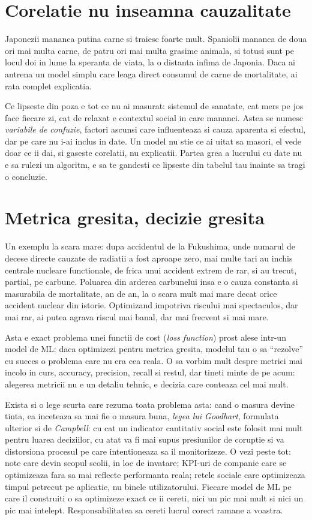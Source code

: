 \section*{Corelatie nu inseamna cauzalitate}

Japonezii mananca putina carne si traiesc foarte mult. Spaniolii mananca
de doua ori mai multa carne, de patru ori mai multa grasime animala, si
totusi sunt pe locul doi in lume la speranta de viata, la o distanta
infima de Japonia. Daca ai antrena un model simplu care leaga direct
consumul de carne de mortalitate, ai rata complet explicatia.

Ce lipseste din poza e tot ce nu ai masurat: sistemul de sanatate, cat
mers pe jos face fiecare zi, cat de relaxat e contextul social in care
mananci. Astea se numesc \textit{variabile de confuzie}, factori ascunsi
care influenteaza si cauza aparenta si efectul, dar pe care nu i-ai
inclus in date. Un model nu stie ce ai uitat sa masori, el vede doar ce
ii dai, si gaseste corelatii, nu explicatii. Partea grea a lucrului cu
date nu e sa rulezi un algoritm, e sa te gandesti ce lipseste din tabelul
tau inainte sa tragi o concluzie.

\section*{Metrica gresita, decizie gresita}

Un exemplu la scara mare: dupa accidentul de la Fukushima, unde numarul
de decese directe cauzate de radiatii a fost aproape zero, mai multe tari
au inchis centrale nucleare functionale, de frica unui accident extrem de
rar, si au trecut, partial, pe carbune. Poluarea din arderea carbunelui
insa e o cauza constanta si masurabila de mortalitate, an de an, la o
scara mult mai mare decat orice accident nuclear din istorie. Optimizand
impotriva riscului mai spectaculos, dar mai rar, ai putea agrava riscul
mai banal, dar mai frecvent si mai mare.

Asta e exact problema unei functii de cost (\textit{loss function}) prost
alese intr-un model de ML: daca optimizezi pentru metrica gresita, modelul
tau o sa ``rezolve'' cu succes o problema care nu era cea reala. O sa
vorbim mult despre metrici mai incolo in curs, accuracy, precision, recall
si restul, dar tineti minte de pe acum: alegerea metricii nu e un detaliu
tehnic, e decizia care conteaza cel mai mult.

Exista si o lege scurta care rezuma toata problema asta: cand o masura
devine tinta, ea inceteaza sa mai fie o masura buna, \textit{legea lui
Goodhart}, formulata ulterior si de \textit{Campbell}: cu cat un indicator
cantitativ social este folosit mai mult pentru luarea deciziilor, cu atat
va fi mai supus presiunilor de coruptie si va distorsiona procesul pe care
intentioneaza sa il monitorizeze. O vezi peste tot: note care devin scopul scolii, in loc de
invatare; KPI-uri de companie care se optimizeaza fara sa mai reflecte
performanta reala; retele sociale care optimizeaza timpul petrecut pe
aplicatie, nu binele utilizatorului. Fiecare model de ML pe care il
construiti o sa optimizeze exact ce ii cereti, nici un pic mai mult si
nici un pic mai intelept. Responsabilitatea sa cereti lucrul corect
ramane a voastra.

